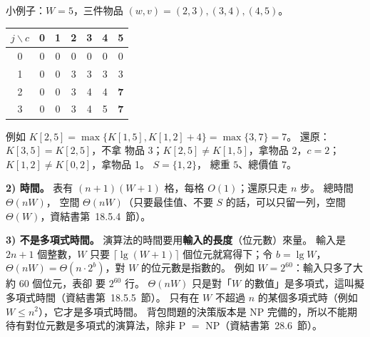 \begin{pastsoln}
小例子：$W = 5$，三件物品 $(w, v) = (2, 3), (3, 4), (4, 5)$。
\begin{center}
\begin{tabular}{c|cccccc}
$j \backslash c$ & 0 & 1 & 2 & 3 & 4 & 5 \\ \hline
0 & 0 & 0 & 0 & 0 & 0 & 0 \\
1 & 0 & 0 & 3 & 3 & 3 & 3 \\
2 & 0 & 0 & 3 & 4 & 4 & \textbf{7} \\
3 & 0 & 0 & 3 & 4 & 5 & \textbf{7} \\
\end{tabular}
\end{center}
例如 $K[2, 5] = \max\{K[1, 5], K[1, 2] + 4\} = \max\{3, 7\} = 7$。 還原：$K[3, 5] = K[2, 5]$，不拿
物品 3；$K[2, 5] \ne K[1, 5]$，拿物品 2，$c = 2$；$K[1, 2] \ne K[0, 2]$，拿物品 1。 $S = \{1, 2\}$，
總重 $5$、總價值 $7$。

\textbf{2) 時間。} 表有 $(n+1)(W+1)$ 格，每格 $O(1)$；還原只走 $n$ 步。 總時間 $\Theta(nW)$，
空間 $\Theta(nW)$（只要最佳值、不要 $S$ 的話，可以只留一列，空間 $\Theta(W)$，資結書第~18.5.4~節）。

\textbf{3) 不是多項式時間。} 演算法的時間要用\textbf{輸入的長度}（位元數）來量。 輸入是 $2n + 1$
個整數，$W$ 只要 $\lceil \lg(W+1) \rceil$ 個位元就寫得下；令 $b = \lg W$，$\Theta(nW) =
\Theta(n \cdot 2^b)$，對 $W$ 的位元數是指數的。 例如 $W = 2^{60}$：輸入只多了大約 $60$ 個位元，表卻
要 $2^{60}$ 行。 $\Theta(nW)$ 只是對「$W$ 的數值」是多項式，這叫擬多項式時間（資結書第~18.5.5~節）。
只有在 $W$ 不超過 $n$ 的某個多項式時（例如 $W \le n^2$），它才是多項式時間。 背包問題的決策版本是
NP 完備的，所以不能期待有對位元數是多項式的演算法，除非 P $=$ NP（資結書第~28.6~節）。
\end{pastsoln}

